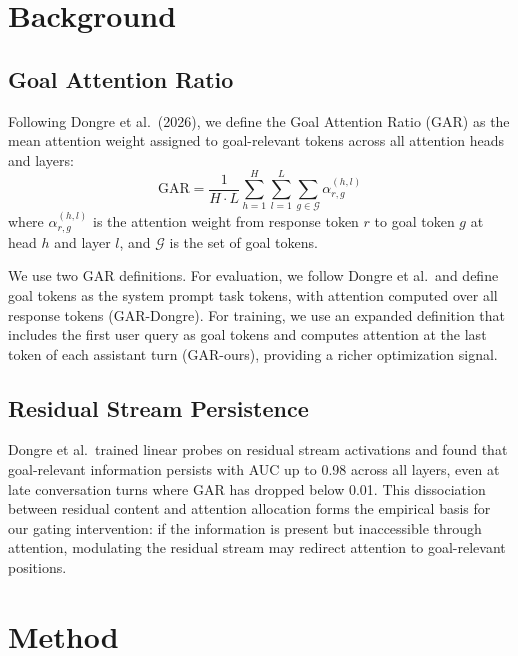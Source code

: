 \documentclass[11pt,a4paper]{article}
\begin{document}
\section{Background}

\subsection{Goal Attention Ratio}

Following Dongre et al.\ (2026), we define the Goal Attention Ratio (GAR) as the mean attention weight assigned to goal-relevant tokens across all attention heads and layers:
\begin{equation}
\text{GAR} = \frac{1}{H \cdot L} \sum_{h=1}^{H} \sum_{l=1}^{L} \sum_{g \in \mathcal{G}} \alpha^{(h,l)}_{r,g}
\end{equation}
where $\alpha^{(h,l)}_{r,g}$ is the attention weight from response token $r$ to goal token $g$ at head $h$ and layer $l$, and $\mathcal{G}$ is the set of goal tokens.

We use two GAR definitions. For evaluation, we follow Dongre et al.\ and define goal tokens as the system prompt task tokens, with attention computed over all response tokens (GAR-Dongre). For training, we use an expanded definition that includes the first user query as goal tokens and computes attention at the last token of each assistant turn (GAR-ours), providing a richer optimization signal.

\subsection{Residual Stream Persistence}

Dongre et al.\ trained linear probes on residual stream activations and found that goal-relevant information persists with AUC up to 0.98 across all layers, even at late conversation turns where GAR has dropped below 0.01.
This dissociation between residual content and attention allocation forms the empirical basis for our gating intervention: if the information is present but inaccessible through attention, modulating the residual stream may redirect attention to goal-relevant positions.


\section{Method}
\end{document}

